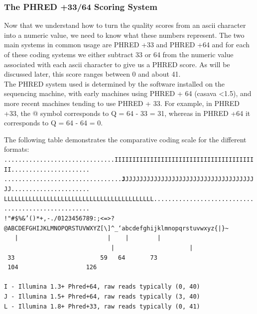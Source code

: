 \subsubsection{The PHRED +33/64 Scoring System}
\begin{information}
Now that we understand how to turn the quality scores from an ascii character into a numeric value, we need to know what these numbers represent.
The two main systems in common usage are PHRED +33 and PHRED +64 and for each of these coding systems we either subtract 33 or 64 from the numeric value associated with each ascii character to give us a PHRED score.
As will be discussed later, this score ranges between 0 and about 41.\\

The PHRED system used is determined by the software installed on the sequencing machine, with early machines using PHRED + 64 (casava \textless 1.5), and more recent machines tending to use PHRED + 33.
For example, in PHRED +33, the @ symbol corresponds to Q = 64 - 33 = 31, whereas in PHRED +64 it corresponds to Q = 64 - 64 = 0. \\
\end{information}

\begin{minipage}{\textwidth}

The following table demonstrates the comparative coding scale for the different formats: \\

\scriptsize
\texttt{...............................IIIIIIIIIIIIIIIIIIIIIIIIIIIIIIIIIIIIIIIII...................... \\
.................................\textbf{J}JJJJJJJJJJJJJJJJJJJJJJJJJJJJJJJJJJJJJJ...................... \\
LLLLLLLLLLLLLLLLLLLLLLLLLLLLLLLLLLLLLLLLLL.................................................... \\
!"\#\$\%\&'()*+,-./0123456789:;\textless =\textgreater?@ABCDEFGHIJKLMNOPQRSTUVWXYZ[\textbackslash]\^{}\_`abcdefghijklmnopqrstuvwxyz\{|\}\~{}} \\
\texttt{
~~|~~~~~~~~~~~~~~~~~~~~~~~~~|~~~~|~~~~~~~~|~~~~~~~~~~~~~~~~~~~~~~~~~~~~~~|~~~~~~~~~~~~~~~~~~~~~|~\\
~33~~~~~~~~~~~~~~~~~~~~~~~~59~~~64~~~~~~~73~~~~~~~~~~~~~~~~~~~~~~~~~~~~104~~~~~~~~~~~~~~~~~~~126~\\
~ \\
I - Illumina 1.3+ Phred+64,  raw reads typically (0, 40) \\
J - Illumina 1.5+ Phred+64,  raw reads typically (3, 40) \\
L - Illumina 1.8+ Phred+33,  raw reads typically (0, 41) \\
}
\end{minipage}

